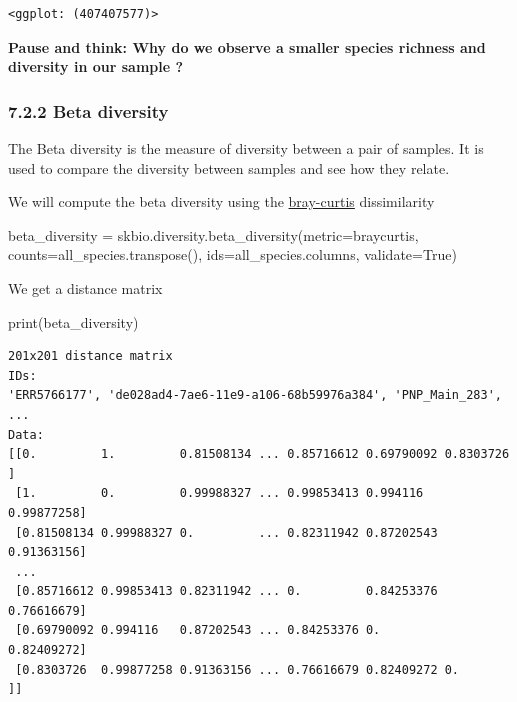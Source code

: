 \documentclass[
  letterpaper,
]{book}
\newenvironment{Shaded}{}{}
\newcommand{\BuiltInTok}[1]{\textcolor[rgb]{0.84,0.23,0.29}{#1}}
\newcommand{\NormalTok}[1]{\textcolor[rgb]{0.14,0.16,0.18}{#1}}
\newcommand{\OperatorTok}[1]{\textcolor[rgb]{0.14,0.16,0.18}{#1}}
\newcommand{\StringTok}[1]{\textcolor[rgb]{0.01,0.18,0.38}{#1}}
\newcommand{\VariableTok}[1]{\textcolor[rgb]{0.89,0.38,0.04}{#1}}
\begin{document}
\begin{verbatim}
<ggplot: (407407577)>
\end{verbatim}

\textbf{Pause and think: Why do we observe a smaller species richness
and diversity in our sample ?}

\hypertarget{beta-diversity}{%
\subsubsection{7.2.2 Beta diversity}\label{beta-diversity}}

The Beta diversity is the measure of diversity between a pair of
samples. It is used to compare the diversity between samples and see how
they relate.

We will compute the beta diversity using the
\href{https://en.wikipedia.org/wiki/Bray\%E2\%80\%93Curtis_dissimilarity}{bray-curtis}
dissimilarity

\begin{Shaded}
\begin{Highlighting}[]
\NormalTok{beta\_diversity }\OperatorTok{=}\NormalTok{ skbio.diversity.beta\_diversity(metric}\OperatorTok{=}\StringTok{\textquotesingle{}braycurtis\textquotesingle{}}\NormalTok{, counts}\OperatorTok{=}\NormalTok{all\_species.transpose(), ids}\OperatorTok{=}\NormalTok{all\_species.columns, validate}\OperatorTok{=}\VariableTok{True}\NormalTok{)}
\end{Highlighting}
\end{Shaded}

We get a distance matrix

\begin{Shaded}
\begin{Highlighting}[]
\BuiltInTok{print}\NormalTok{(beta\_diversity)}
\end{Highlighting}
\end{Shaded}

\begin{verbatim}
201x201 distance matrix
IDs:
'ERR5766177', 'de028ad4-7ae6-11e9-a106-68b59976a384', 'PNP_Main_283', ...
Data:
[[0.         1.         0.81508134 ... 0.85716612 0.69790092 0.8303726 ]
 [1.         0.         0.99988327 ... 0.99853413 0.994116   0.99877258]
 [0.81508134 0.99988327 0.         ... 0.82311942 0.87202543 0.91363156]
 ...
 [0.85716612 0.99853413 0.82311942 ... 0.         0.84253376 0.76616679]
 [0.69790092 0.994116   0.87202543 ... 0.84253376 0.         0.82409272]
 [0.8303726  0.99877258 0.91363156 ... 0.76616679 0.82409272 0.        ]]
\end{verbatim}
\end{document}

